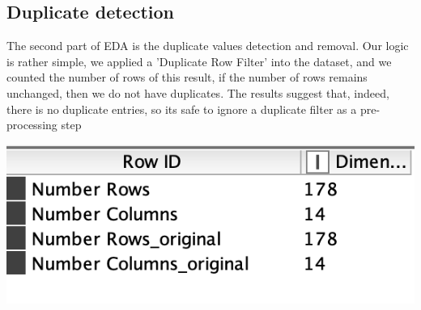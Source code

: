 \documentclass[11pt]{article}
\begin{document}
		\subsection*{Duplicate detection}
			The second part of EDA is the duplicate values detection and removal. Our logic is rather simple, we applied a 'Duplicate Row Filter' into the dataset, and we counted the number of rows of this result, if the number of rows remains unchanged, then we do not have duplicates. The results suggest that, indeed, there is no duplicate entries, so its safe to ignore a duplicate filter as a pre-processing step
			\iftrue
			\begin{center}
				\includegraphics[scale=0.5]{res/t0/t02/t02-results}
			\end{center}
			\fi
\end{document}

